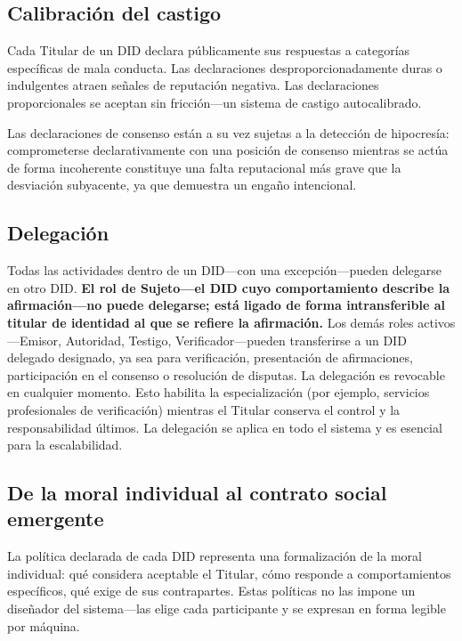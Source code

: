 \documentclass[11pt,a4paper,twocolumn]{article}
\begin{document}
\subsection{Calibración del castigo}

Cada Titular de un DID declara públicamente sus respuestas a categorías específicas de mala conducta. Las declaraciones desproporcionadamente duras o indulgentes atraen señales de reputación negativa. Las declaraciones proporcionales se aceptan sin fricción---un sistema de castigo autocalibrado.

Las declaraciones de consenso están a su vez sujetas a la detección de hipocresía: comprometerse declarativamente con una posición de consenso mientras se actúa de forma incoherente constituye una falta reputacional más grave que la desviación subyacente, ya que demuestra un engaño intencional.

\subsection{Delegación}

Todas las actividades dentro de un DID---con una excepción---pueden delegarse en otro DID. \textbf{El rol de Sujeto---el DID cuyo comportamiento describe la afirmación---no puede delegarse; está ligado de forma intransferible al titular de identidad al que se refiere la afirmación.} Los demás roles activos---Emisor, Autoridad, Testigo, Verificador---pueden transferirse a un DID delegado designado, ya sea para verificación, presentación de afirmaciones, participación en el consenso o resolución de disputas. La delegación es revocable en cualquier momento. Esto habilita la especialización (por ejemplo, servicios profesionales de verificación) mientras el Titular conserva el control y la responsabilidad últimos. La delegación se aplica en todo el sistema y es esencial para la escalabilidad.

\subsection{De la moral individual al contrato social emergente}

La política declarada de cada DID representa una formalización de la moral individual: qué considera aceptable el Titular, cómo responde a comportamientos específicos, qué exige de sus contrapartes. Estas políticas no las impone un diseñador del sistema---las elige cada participante y se expresan en forma legible por máquina.
\end{document}
